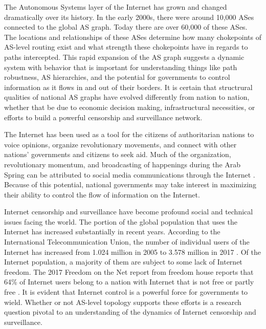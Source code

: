 \documentclass{article}
\begin{document}
\begin{multicols}{2}
The Autonomous Systems layer of the Internet has grown and changed dramatically over its history.
In the early 2000s, there were around 10,000 ASes connected to the global AS graph. Today there are
over 60,000 of these ASes. The locations and relationships of these ASes determine how many chokepoints
of AS-level routing exist and what strength these chokepoints have in regards to paths intercepted.
This rapid expansion of the AS graph suggests a dynamic system with behavior that is important for
understanding things like path robustness, AS hierarchies, and the potential for governments to control
information as it flows in and out of their borders. It is certain that structrural qualities of national
AS graphs have evolved differently from nation to nation, whether that be due to economic decision making, infrastructural
necessities, or efforts to build a powerful censorship and surveillance network.

\par
The Internet has been used as a tool for the citizens of authoritarian nations to voice opinions,
organize revolutionary movements, and connect with other nations' governments and citizens
to seek aid. Much of the organization, revolutionary momentum, and broadcasting
of happenings during the Arab Spring can be attributed to social media communications
through the Internet \cite{arabspring}. Because of this potential, national governments may
take interest in maximizing their ability to control the flow of information on the Internet.
\par
Internet censorship and surveillance have become profound social and technical issues facing the world. The portion of the
global population that uses the Internet has increased substantially in recent years. According to the International Telecommunication Union,
the number of individual users of the Internet has increased from 1.024 million in 2005 to 3.578 million in 2017 \cite{itu}. Of the Internet
population, a majority of them are subject to some lack of Internet freedom. The 2017 Freedom on the Net report from freedom house reports that
64\% of Internet users belong to a nation with Internet that is not free or partly free \cite{FOTN}. It is evident that Internet control is
a powerful force for governments to wield. Whether or not AS-level topology supports these efforts is a research question pivotal to
an understanding of the dynamics of Internet censorship and surveillance.


\end{multicols}
\end{document}
